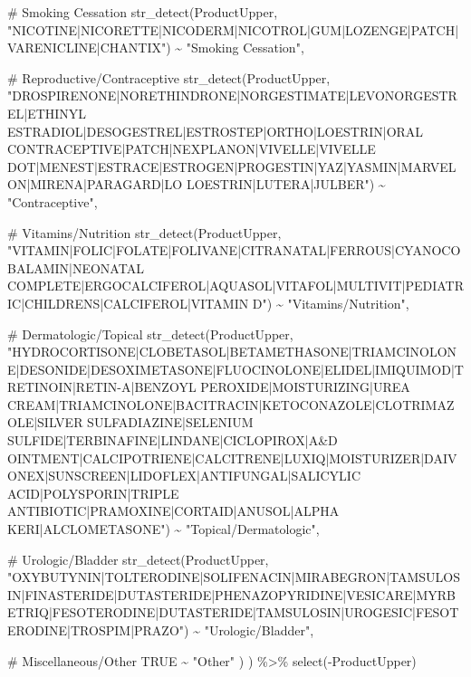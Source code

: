 \documentclass[
  letterpaper,
  DIV=11,
  numbers=noendperiod]{scrartcl}
\newenvironment{Shaded}{\begin{snugshade}}{\end{snugshade}}
\newcommand{\CommentTok}[1]{\textcolor[rgb]{0.37,0.37,0.37}{#1}}
\newcommand{\ConstantTok}[1]{\textcolor[rgb]{0.56,0.35,0.01}{#1}}
\newcommand{\FunctionTok}[1]{\textcolor[rgb]{0.28,0.35,0.67}{#1}}
\newcommand{\NormalTok}[1]{\textcolor[rgb]{0.00,0.23,0.31}{#1}}
\newcommand{\SpecialCharTok}[1]{\textcolor[rgb]{0.37,0.37,0.37}{#1}}
\newcommand{\StringTok}[1]{\textcolor[rgb]{0.13,0.47,0.30}{#1}}
\begin{document}
\begin{Shaded}
\begin{Highlighting}[]
        \CommentTok{\# Smoking Cessation}
        \FunctionTok{str\_detect}\NormalTok{(ProductUpper, }\StringTok{"NICOTINE|NICORETTE|NICODERM|NICOTROL|GUM|LOZENGE|PATCH|VARENICLINE|CHANTIX"}\NormalTok{) }\SpecialCharTok{\textasciitilde{}} \StringTok{"Smoking Cessation"}\NormalTok{,}
  
        \CommentTok{\# Reproductive/Contraceptive}
        \FunctionTok{str\_detect}\NormalTok{(ProductUpper, }\StringTok{"DROSPIRENONE|NORETHINDRONE|NORGESTIMATE|LEVONORGESTREL|ETHINYL ESTRADIOL|DESOGESTREL|ESTROSTEP|ORTHO|LOESTRIN|ORAL CONTRACEPTIVE|PATCH|NEXPLANON|VIVELLE|VIVELLE DOT|MENEST|ESTRACE|ESTROGEN|PROGESTIN|YAZ|YASMIN|MARVELON|MIRENA|PARAGARD|LO LOESTRIN|LUTERA|JULBER"}\NormalTok{) }\SpecialCharTok{\textasciitilde{}} \StringTok{"Contraceptive"}\NormalTok{,}
  
        \CommentTok{\# Vitamins/Nutrition}
        \FunctionTok{str\_detect}\NormalTok{(ProductUpper, }\StringTok{"VITAMIN|FOLIC|FOLATE|FOLIVANE|CITRANATAL|FERROUS|CYANOCOBALAMIN|NEONATAL COMPLETE|ERGOCALCIFEROL|AQUASOL|VITAFOL|MULTIVIT|PEDIATRIC|CHILDREN\textquotesingle{}S|CALCIFEROL|VITAMIN D"}\NormalTok{) }\SpecialCharTok{\textasciitilde{}} \StringTok{"Vitamins/Nutrition"}\NormalTok{,}
  
        \CommentTok{\# Dermatologic/Topical}
        \FunctionTok{str\_detect}\NormalTok{(ProductUpper, }\StringTok{"HYDROCORTISONE|CLOBETASOL|BETAMETHASONE|TRIAMCINOLONE|DESONIDE|DESOXIMETASONE|FLUOCINOLONE|ELIDEL|IMIQUIMOD|TRETINOIN|RETIN{-}A|BENZOYL PEROXIDE|MOISTURIZING|UREA CREAM|TRIAMCINOLONE|BACITRACIN|KETOCONAZOLE|CLOTRIMAZOLE|SILVER SULFADIAZINE|SELENIUM SULFIDE|TERBINAFINE|LINDANE|CICLOPIROX|A\&D OINTMENT|CALCIPOTRIENE|CALCITRENE|LUXIQ|MOISTURIZER|DAIVONEX|SUNSCREEN|LIDOFLEX|ANTIFUNGAL|SALICYLIC ACID|POLYSPORIN|TRIPLE ANTIBIOTIC|PRAMOXINE|CORTAID|ANUSOL|ALPHA KERI|ALCLOMETASONE"}\NormalTok{) }\SpecialCharTok{\textasciitilde{}} \StringTok{"Topical/Dermatologic"}\NormalTok{,}
  
        \CommentTok{\# Urologic/Bladder}
        \FunctionTok{str\_detect}\NormalTok{(ProductUpper, }\StringTok{"OXYBUTYNIN|TOLTERODINE|SOLIFENACIN|MIRABEGRON|TAMSULOSIN|FINASTERIDE|DUTASTERIDE|PHENAZOPYRIDINE|VESICARE|MYRBETRIQ|FESOTERODINE|DUTASTERIDE|TAMSULOSIN|UROGESIC|FESOTERODINE|TROSPIM|PRAZO"}\NormalTok{) }\SpecialCharTok{\textasciitilde{}} \StringTok{"Urologic/Bladder"}\NormalTok{,}
  
        \CommentTok{\# Miscellaneous/Other}
        \ConstantTok{TRUE} \SpecialCharTok{\textasciitilde{}} \StringTok{"Other"}
\NormalTok{      )}
\NormalTok{    ) }\SpecialCharTok{\%\textgreater{}\%}
    \FunctionTok{select}\NormalTok{(}\SpecialCharTok{{-}}\NormalTok{ProductUpper) }


\end{Highlighting}
\end{Shaded}
\end{document}
